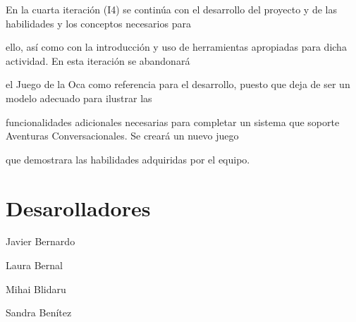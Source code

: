 En la cuarta iteración (I4) se continúa con el desarrollo del proyecto y de las habilidades y los conceptos necesarios para \par
 ello, así como con la introducción y uso de herramientas apropiadas para dicha actividad. En esta iteración se abandonará \par
 el Juego de la Oca como referencia para el desarrollo, puesto que deja de ser un modelo adecuado para ilustrar las \par
 funcionalidades adicionales necesarias para completar un sistema que soporte Aventuras Conversacionales. Se creará un nuevo juego\par
 que demostrara las habilidades adquiridas por el equipo. \par
\hypertarget{index_dev}{}\section{Desarolladores}\label{index_dev}

\begin{DoxyItemize}
\item Javier Bernardo
\item Laura Bernal
\item Mihai Blidaru
\item Sandra Benítez 
\end{DoxyItemize}